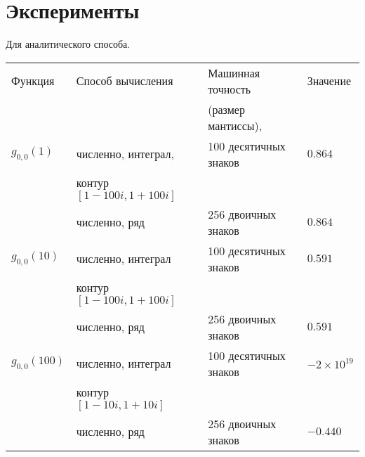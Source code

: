 \documentclass[../paper.tex]{subfiles}
\begin{document}
\section{Эксперименты}
%
Для аналитического способа.

\begin{tabular}{ l l l l }
\hline
    Функция        & Способ вычисления                              & Машинная точность                     & Значение                  \\ 
                   &                                                & (размер мантиссы),                    &                           \\
\hline%
    $g_{0,0}(1)$   & численно, интеграл,                            & 100 десятичных знаков                 & $ 0.864$                  \\
	           & контур $[1-100i, 1+100i]$                      &                                       &                           \\

	           & численно, ряд                                  & 256 двоичных знаков                   & $ 0.864$                  \\

    $g_{0,0}(10)$  & численно, интеграл                             & 100 десятичных знаков                 & $ 0.591$                  \\
                   & контур $[1-100i, 1+100i]$                      &                                       &                           \\

                   & численно, ряд                                  & 256 двоичных знаков                   & $ 0.591$                  \\

    $g_{0,0}(100)$ & численно, интеграл                             & 100 десятичных знаков                 & $-2 \times 10^{19}$       \\
	           & контур $[1-10i, 1+10i]$                        &                                       &                           \\
		   
                   & численно, ряд                                  & 256 двоичных знаков                   & $-0.440$                  \\
\hline
\end{tabular}
\end{document}
